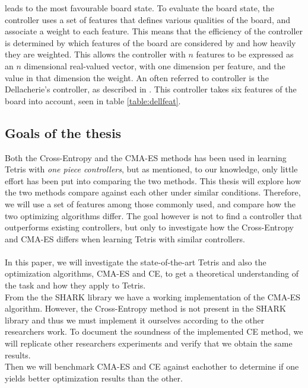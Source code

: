 leads to the most favourable board state. To evaluate the board 
state, the controller uses a set of features that defines 
various qualities of the board, and associate a weight to each 
feature. This means that the efficiency of the controller 
is determined by which features of the board are considered by
and how heavily they are weighted. This allows
the controller with $n$ features to be expressed as an 
$n$ dimensional real-valued vector, with one dimension 
per feature, and the value in that dimension the weight.
An often referred to controller is the Dellacherie's controller, as described in \cite{scherrer2009}. This controller
takes six features of the board into account, seen in table 
\ref{table:dellfeat}.



\subsection{Goals of the thesis}

Both the Cross-Entropy and the CMA-ES methods has been used 
in learning Tetris with \textit{one piece controllers}, but as 
mentioned, to our knowledge, only little effort has been put into 
comparing the two methods. This thesis will explore
how the two methods compare against each other under similar
conditions. Therefore, we will use a set of features among those
commonly used, and compare how the two optimizing algorithms 
differ. The goal however is not to find a controller that 
outperforms existing controllers, but only to investigate 
how the Cross-Entropy and CMA-ES differs when learning Tetris
with similar controllers.\\
\\
In this paper, we will investigate the state-of-the-art Tetris and also the optimization 
algorithms, CMA-ES and CE, to get a theoretical understanding of the task and how they 
apply to Tetris.\\
From the the SHARK library \citep{shark08} we have a working implementation of the CMA-ES 
algorithm. However, the Cross-Entropy method is not present in the SHARK library and thus 
we must implement it ourselves according to the other researchers work. To document the 
soundness of the implemented CE method, we will replicate other researchers experiments and 
verify that we obtain the same results.\\
Then we will benchmark CMA-ES and CE against eachother to determine if one yields better optimization results than the other.

